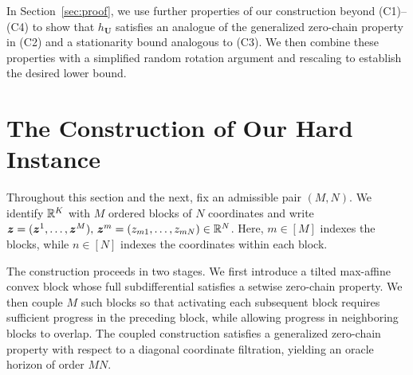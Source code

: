 In Section~\ref{sec:proof}, we use further properties
of our construction beyond \textnormal{(C1)--(C4)}
to show that $h_{\mathbf U}$ satisfies an analogue
of the generalized zero-chain property in
\textnormal{(C2)} and a stationarity bound analogous
to \textnormal{(C3)}.
We then combine these properties with a simplified
random rotation argument and rescaling to establish
the desired lower bound.


\section{The Construction of Our Hard Instance}
\label{sec:construction}
Throughout this section and the next, fix an admissible
pair $(M,N)$.
We identify ${\mathbb{R}}^K$ with $M$ ordered blocks of $N$ coordinates
and write $\bm{z}=(\bm{z}^1,\ldots,\bm{z}^M),\,\bm{z}^m=(z_{m1},\ldots,z_{mN})\in{\mathbb{R}}^N $.
Here, $m\in[M]$ indexes the blocks, while $n\in[N]$ indexes
the coordinates within each block.

The construction proceeds in two stages. We first introduce
a tilted max-affine convex block whose full subdifferential
satisfies a setwise zero-chain property. We then couple $M$
such blocks so that activating each subsequent block requires
sufficient progress in the preceding block, while allowing
progress in neighboring blocks to overlap. The coupled
construction satisfies a generalized zero-chain property
with respect to a diagonal coordinate filtration, yielding
an oracle horizon of order $MN$.

